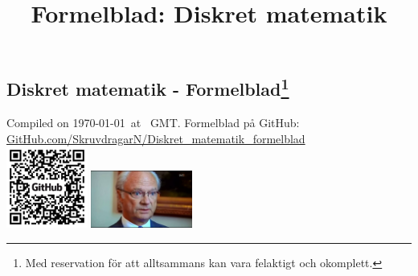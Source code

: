 \documentclass{article}
\title{Formelblad: Diskret matematik}
\begin{document}
\begin{multicols}{2}
\section*{Diskret matematik - Formelblad\footnote{Med reservation för att alltsammans kan vara felaktigt och okomplett.}}
Compiled on \today\ at \currenttime \ GMT. Formelblad på GitHub: \href{https://github.com/SkruvdragarN/Diskret_matematik_formelblad}{\url{GitHub.com/SkruvdragarN/Diskret_matematik_formelblad}}\\
\includegraphics[width=0.2\textwidth]{images/qr}
\includegraphics[width=0.25\textwidth]{images/knug}


\end{multicols}
\end{document}
